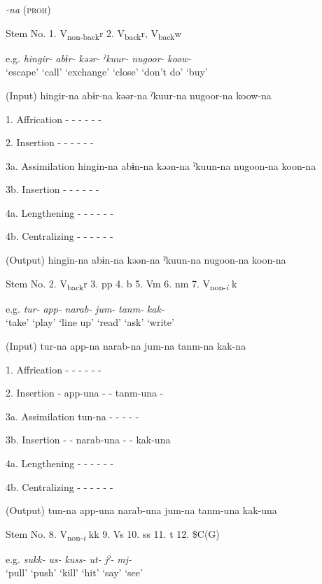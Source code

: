 \begin{table}
\caption{\label{tab:key:64}. Verbal stems +} \textmd{\textit{-na}}\textmd{ (\textsc{proh})}

Stem No.  1. V\textsubscript{non-back}r  2. V\textsubscript{back}r, V\textsubscript{back}w

  e.g.  \textit{hingir-}  \textit{abɨr-}  \textit{kəər-}  \textit{ˀkuur-}  \textit{nugoor-}  \textit{koow-}\\
\glt ‘escape’  ‘call’  ‘exchange’  ‘close’  ‘don’t do’  ‘buy’

  (Input)  hingir-na  abɨr-na  kəər-na  ˀkuur-na  nugoor-na  koow-na

1.  Affrication  -  -  -  -  -  -

2.  Insertion  -  -  -  -  -  -

3a.  Assimilation  hingin-na  abɨn-na  kəən-na  ˀkuun-na  nugoon-na  koon-na

3b.  Insertion  -  -  -  -  -  -

4a.  Lengthening  -  -  -  -  -  -

4b.  Centralizing  -  -  -  -  -  -

  (Output)  hingin-na  abɨn-na  kəən-na  ˀkuun-na  nugoon-na  koon-na

Stem No.  2. V\textsubscript{back}r  3. pp  4. b  5. Vm  6. nm  7. V\textsubscript{non-}\textit{\textsubscript{i} }k

  e.g.  \textit{tur-}  \textit{app-}  \textit{narab-}  \textit{jum-}  \textit{tanm-}  \textit{kak-}\\
\glt ‘take’  ‘play’  ‘line up’  ‘read’  ‘ask’  ‘write’

  (Input)  tur-na  app-na  narab-na  jum-na  tanm-na  kak-na

1.  Affrication  -  -  -  -  -  -

2.  Insertion  -  app-una  -  -  tanm-una  -

3a.  Assimilation  tun-na  -  -  -  -  -

3b.  Insertion  -  -  narab-una  -  -  kak-una

4a.  Lengthening  -  -  -  -  -  -

4b.  Centralizing  -  -  -  -  -  -

  (Output)  tun-na  app-una  narab-una  jum-na  tanm-una  kak-una

  Stem No.  8. V\textsubscript{non-}\textit{\textsubscript{i} }kk  9. Vs  10. ss  11. t  12. \$C(G)

  e.g.  \textit{sukk-}  \textit{us-}  \textit{kuss-}  \textit{ut-}  \textit{jˀ-}  \textit{mj-}\\
\glt ‘pull’  ‘push’  ‘kill’  ‘hit’  ‘say’  ‘see’


\end{table}
